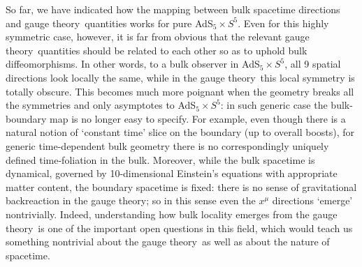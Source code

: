 \documentclass[12pt]{article}
\def\GT{gauge theory}
\def\adss#1#2{AdS$_{#1} \times S^{#2}$}
\begin{document}
So far, we have indicated how the mapping between bulk spacetime directions and \GT\ quantities   works for pure \adss55.   Even for this highly symmetric case, however,  it is far from obvious that the relevant \GT\ quantities should be related to each other so as to uphold bulk diffeomorphisms.  In other words, to a bulk observer in \adss55, all 9 spatial directions look locally the same, while in the \GT\ this local symmetry is totally obscure.  
This becomes much more poignant when the geometry breaks all the symmetries and only asymptotes to \adss55: in such generic case the bulk-boundary map is no longer easy to specify. 
For example, even though there is a natural notion of `constant time' slice on the boundary (up to overall boosts), for generic  time-dependent bulk geometry there is no correspondingly uniquely defined time-foliation in the bulk.  
Moreover, while the bulk spacetime is dynamical, governed by 10-dimensional Einstein's equations with appropriate matter content, the boundary spacetime is fixed: there is no sense of gravitational backreaction in the \GT; so in this sense even the $x^\mu$ directions `emerge' nontrivially.
Indeed, understanding how bulk locality emerges from the \GT\ is one of the important open questions in this field, which would teach us something nontrivial about the \GT\ as well as about the nature of spacetime.
\end{document}
